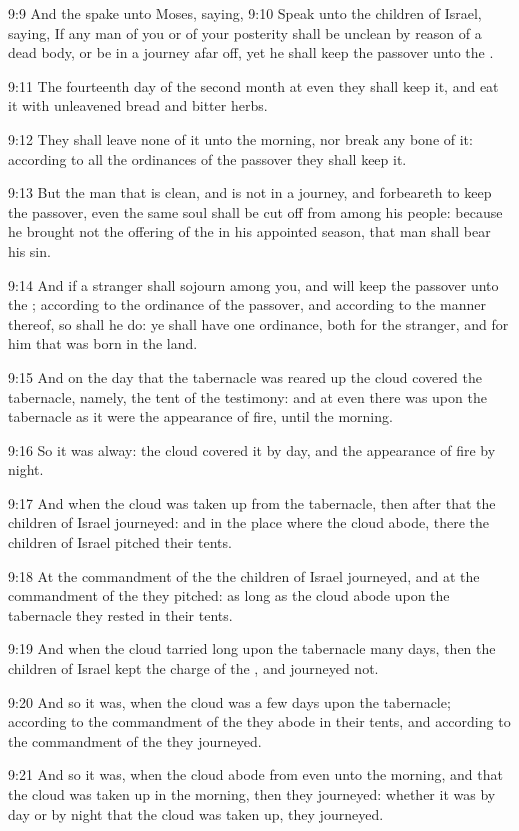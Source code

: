 9:9 And the \LORD spake unto Moses, saying, 9:10 Speak unto the children of Israel, saying, If any man of you or of your posterity shall be unclean by reason of a dead body, or be in a journey afar off, yet he shall keep the passover unto the \LORD.

9:11 The fourteenth day of the second month at even they shall keep it, and eat it with unleavened bread and bitter herbs.

9:12 They shall leave none of it unto the morning, nor break any bone of it: according to all the ordinances of the passover they shall keep it.

9:13 But the man that is clean, and is not in a journey, and forbeareth to keep the passover, even the same soul shall be cut off from among his people: because he brought not the offering of the \LORD in his appointed season, that man shall bear his sin.

9:14 And if a stranger shall sojourn among you, and will keep the passover unto the \LORD; according to the ordinance of the passover, and according to the manner thereof, so shall he do: ye shall have one ordinance, both for the stranger, and for him that was born in the land.

9:15 And on the day that the tabernacle was reared up the cloud covered the tabernacle, namely, the tent of the testimony: and at even there was upon the tabernacle as it were the appearance of fire, until the morning.

9:16 So it was alway: the cloud covered it by day, and the appearance of fire by night.

9:17 And when the cloud was taken up from the tabernacle, then after that the children of Israel journeyed: and in the place where the cloud abode, there the children of Israel pitched their tents.

9:18 At the commandment of the \LORD the children of Israel journeyed, and at the commandment of the \LORD they pitched: as long as the cloud abode upon the tabernacle they rested in their tents.

9:19 And when the cloud tarried long upon the tabernacle many days, then the children of Israel kept the charge of the \LORD, and journeyed not.

9:20 And so it was, when the cloud was a few days upon the tabernacle; according to the commandment of the \LORD they abode in their tents, and according to the commandment of the \LORD they journeyed.

9:21 And so it was, when the cloud abode from even unto the morning, and that the cloud was taken up in the morning, then they journeyed: whether it was by day or by night that the cloud was taken up, they journeyed.

